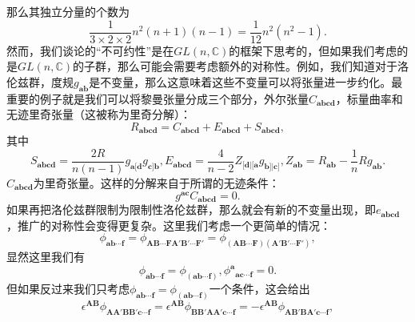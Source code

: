 那么其独立分量的个数为
\begin{equation*}
	\frac{1}{3\times 2\times 2} n^{2}( n+1)( n-1) =\frac{1}{12} n^{2} (n^{2} -1).
\end{equation*}
然而，我们谈论的“不可约性”是在$GL( n,\mathbb{C})$的框架下思考的，但如果我们考虑的是$GL( n,\mathbb{C})$的子群，那么可能会需要考虑额外的对称性。例如，我们知道对于洛伦兹群，度规$g_{\boldsymbol{ab}}$是不变量，那么这意味着这些不变量可以将张量进一步约化。最重要的例子就是我们可以将黎曼张量分成三个部分，外尔张量$C_{\boldsymbol{abcd}}$，标量曲率和无迹里奇张量（这被称为里奇分解）：
\begin{equation*}
	R\boldsymbol{_{abcd}} =C\boldsymbol{_{abcd}} +E\boldsymbol{_{abcd}} +S\boldsymbol{_{abcd}} ,
\end{equation*}
其中
\begin{equation*}
	S\boldsymbol{_{abcd}} =\frac{2R}{n( n-1)} g_{\boldsymbol{a}[\boldsymbol{d}} g_{\boldsymbol{c}]\boldsymbol{b}} ,E\boldsymbol{_{abcd}} =\frac{4}{n-2} Z_{[\boldsymbol{d} |[\boldsymbol{a}} g_{\boldsymbol{b}] |\boldsymbol{c}]} ,Z_{\boldsymbol{ab}} =R_{\boldsymbol{ab}} -\frac{1}{n} Rg_{\boldsymbol{ab}} .
\end{equation*}
$C_{\boldsymbol{abcd}}$为里奇张量。这样的分解来自于所谓的无迹条件：
\begin{equation*}
	g^{\boldsymbol{ac}} C_{\boldsymbol{abcd}} =0.
\end{equation*}
如果再把洛伦兹群限制为限制性洛伦兹群，那么就会有新的不变量出现，即$e_{\boldsymbol{abcd}}$，推广的对称性会变得更复杂。这里我们考虑一个更简单的情况：
\begin{equation*}
	\phi _{\boldsymbol{ab} \cdots \boldsymbol{f}} =\phi _{\boldsymbol{AB} \cdots \boldsymbol{FA} '\boldsymbol{B} '\cdots \boldsymbol{F} '} =\phi _{(\boldsymbol{AB} \cdots \boldsymbol{F})(\boldsymbol{A} '\boldsymbol{B} '\cdots \boldsymbol{F} ')} ,
\end{equation*}
显然这里我们有
\begin{equation}
	\phi _{\boldsymbol{ab} \cdots \boldsymbol{f}} =\phi _{(\boldsymbol{ab} \cdots \boldsymbol{f})} ,\phi ^{\boldsymbol{a}}{}_{\boldsymbol{ac} \cdots \boldsymbol{f}} =0.
	\label{eq:4.20}
\end{equation}
但如果反过来我们只考虑$\phi _{\boldsymbol{ab} \cdots \boldsymbol{f}} =\phi _{(\boldsymbol{ab} \cdots \boldsymbol{f})}$一个条件，这会给出
\begin{equation*}
	\epsilon ^{\boldsymbol{AB}} \phi _{\boldsymbol{AA} '\boldsymbol{BB} '\boldsymbol{c} \cdots \boldsymbol{f}} =\epsilon ^{\boldsymbol{AB}} \phi _{\boldsymbol{BB 'AA} '\boldsymbol{c} \cdots \boldsymbol{f}} =-\epsilon ^{\boldsymbol{AB}} \phi _{\boldsymbol{AB'BA} '\boldsymbol{c} \cdots \boldsymbol{f}} ,
\end{equation*}
